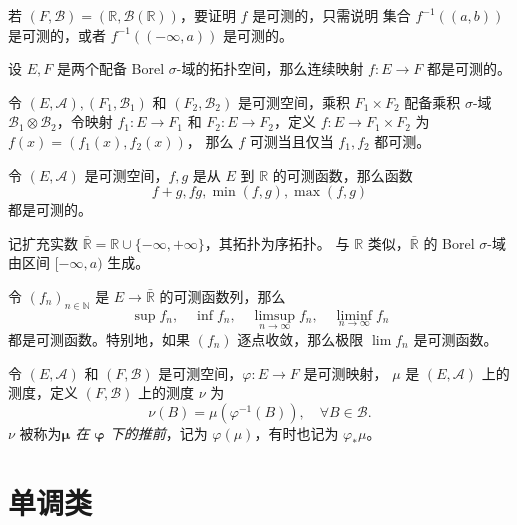 \documentclass[fontset=none]{Notes}
\begin{document}
\begin{example}
  若 $(F,\mathcal{B})=(\mathbb{R},\mathcal{B}(\mathbb{R}))$，要证明 $f$ 是可测的，只需说明
  集合 $f^{-1}((a,b))$ 是可测的，或者 $f^{-1}((-\infty,a))$ 是可测的。
\end{example}

\begin{corollary}
  设 $E,F$ 是两个配备 Borel $\sigma$-域的拓扑空间，那么连续映射 $f:E\to F$ 都是可测的。
\end{corollary}

\begin{lemma}
  令 $(E,\mathcal{A}),(F_1,\mathcal{B}_1)$ 和 $(F_2,\mathcal{B}_2)$ 是可测空间，乘积
  $F_1\times F_2$ 配备乘积 $\sigma$-域 $\mathcal{B}_1\otimes \mathcal{B}_2$，令映射
  $f_1:E\to F_1$ 和 $F_2:E\to F_2$，定义 $f:E\to F_1\times F_2$ 为 $f(x)=(f_1(x),f_2(x))$，
  那么 $f$ 可测当且仅当 $f_1,f_2$ 都可测。
\end{lemma}

\begin{corollary}
  令 $(E,\mathcal{A})$ 是可测空间，$f,g$ 是从 $E$ 到 $\mathbb{R}$ 的可测函数，那么函数
  \[ 
    f+g,fg,\min(f,g),\max(f,g)
  \] 
  都是可测的。
\end{corollary}

记扩充实数 $\bar{\mathbb{R}}=\mathbb{R}\cup\{-\infty,+\infty\}$，其拓扑为序拓扑。
与 $\mathbb{R}$ 类似，$\bar{\mathbb{R}}$ 的 Borel $\sigma$-域由区间 $[-\infty,a)$
生成。

\begin{proposition}
  令 $(f_n)_{n\in \mathbb{N}}$ 是 $E\to\bar{\mathbb{R}}$ 的可测函数列，那么
  \[
    \sup f_n,\quad \inf f_n,\quad \limsup_{n\to\infty}f_n,\quad \liminf_{n\to\infty} f_n
  \]
  都是可测函数。特别地，如果 $(f_n)$ 逐点收敛，那么极限 $\lim f_n$ 是可测函数。
\end{proposition}

\begin{definition}
  令 $(E,\mathcal{A})$ 和 $(F,\mathcal{B})$ 是可测空间，$\varphi:E\to F$ 是可测映射， 
  $\mu$ 是 $(E,\mathcal{A})$ 上的测度，定义 $(F,\mathcal{B})$ 上的测度 $\nu$ 为
  \[
    \nu(B)=\mu(\varphi^{-1}(B)),\quad \forall B\in \mathcal{B}.
  \]
  $\nu$ 被称为\emph{$\mathbold\mu$ 在 $\mathbold\varphi$ 下的推前}，记为
  $\varphi(\mu)$，有时也记为 $\varphi_*\mu$。
\end{definition}

\section{单调类}
\end{document}
